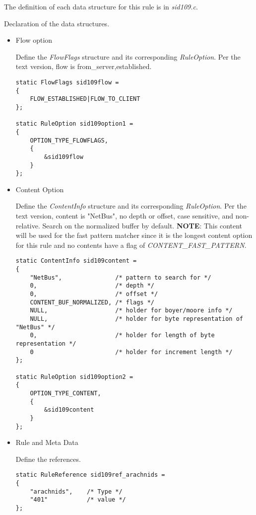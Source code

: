 \documentclass[english]{report}
\begin{document}
The definition of each data structure for this rule is in {\em sid109.c}.

Declaration of the data structures.

\begin{itemize}

\item{Flow option}

Define the {\em FlowFlags} structure and its corresponding {\em RuleOption}.
Per the text version, flow is from\_server,established.

\begin{verbatim}
static FlowFlags sid109flow =
{
    FLOW_ESTABLISHED|FLOW_TO_CLIENT
};

static RuleOption sid109option1 =
{
    OPTION_TYPE_FLOWFLAGS,
    {
        &sid109flow
    }
};
\end{verbatim}

\item{Content Option}

Define the {\em ContentInfo} structure and its corresponding {\em RuleOption}.
Per the text version, content is "NetBus", no depth or offset, case sensitive,
and non-relative.  Search on the normalized buffer by default.  {\bf NOTE}:
This content will be used for the fast pattern matcher since it is the longest
content option for this rule and no contents have a flag of {\em
CONTENT\_FAST\_PATTERN}.

\begin{verbatim}
static ContentInfo sid109content =
{
    "NetBus",               /* pattern to search for */
    0,                      /* depth */
    0,                      /* offset */
    CONTENT_BUF_NORMALIZED, /* flags */
    NULL,                   /* holder for boyer/moore info */
    NULL,                   /* holder for byte representation of "NetBus" */
    0,                      /* holder for length of byte representation */
    0                       /* holder for increment length */
};

static RuleOption sid109option2 =
{
    OPTION_TYPE_CONTENT,
    {
        &sid109content
    }
};
\end{verbatim}

\item{Rule and Meta Data}

Define the references.

\begin{verbatim}
static RuleReference sid109ref_arachnids =
{
    "arachnids",    /* Type */
    "401"           /* value */
};


\end{verbatim}
\end{itemize}
\end{document}
